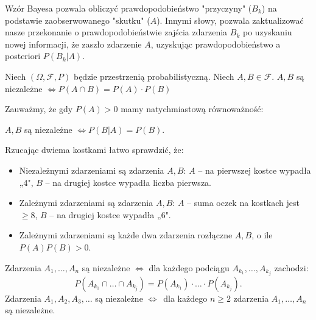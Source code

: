\documentclass[final,a4paper,openany,12pt]{mwbk}
\begin{document}
Wzór Bayesa pozwala obliczyć prawdopodobieństwo "przyczyny" ($B_k$) na podstawie zaobserwowanego "skutku" ($A$). Innymi słowy, pozwala zaktualizować nasze przekonanie o prawdopodobieństwie zajścia zdarzenia $B_k$ po uzyskaniu nowej informacji, że zaszło zdarzenie $A$, uzyskując prawdopodobieństwo a posteriori $P(B_k|A)$.

\begin{Def}
Niech $(\Omega, \mathcal{F}, P)$ będzie przestrzenią probabilistyczną. Niech $A, B \in \mathcal{F}$. 
$A, B$ są niezależne $\iff P(A \cap B) = P(A) \cdot P(B) $
\end{Def}

Zauważmy, że gdy $P(A) > 0$ mamy natychmiastową równoważność:
\begin{center}
$A, B$ są niezależne $\iff P(B|A) = P(B)$.
\end{center}

\begin{Prz}
    Rzucając dwiema kostkami łatwo sprawdzić, że:
\begin{itemize}
    \item Niezależnymi zdarzeniami są zdarzenia $A, B$: $A$ – na pierwszej kostce wypadła „4", $B$ – na drugiej kostce wypadła liczba pierwsza.
    \item Zależnymi zdarzeniami są zdarzenia $A, B$: $A$ – suma oczek na kostkach jest $\ge 8$, $B$ – na drugiej kostce wypadła „6".
    \item Zależnymi zdarzeniami są każde dwa zdarzenia rozłączne $A, B$, o ile $P(A)P(B) > 0$.
\end{itemize}
\end{Prz}

\begin{Def}
 Zdarzenia $A_1, \dots, A_n$ są niezależne $\iff$ dla każdego podciągu $A_{k_1}, \dots, A_{k_j}$ zachodzi:
\[ P(A_{k_1} \cap \dots \cap A_{k_j}) = P(A_{k_1}) \cdot \dots \cdot P(A_{k_j}). \]
Zdarzenia $A_1, A_2, A_3, \dots$ są niezależne $\iff$\ dla każdego $n \ge 2$ zdarzenia $A_1, \dots, A_n$ są niezależne. 
\end{Def}



\printbibliography
\end{document}
